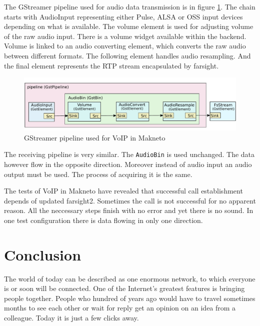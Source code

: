 The GStreamer pipeline used for audio data transmission is in figure \ref{fig:maknetoGstreamerPipeline}. The chain starts with AudioInput representing either Pulse, ALSA or OSS input devices depending on what is available. The volume element is used for adjusting volume of the raw audio input. There is a volume widget available within the backend. Volume is linked to an audio converting element, which converts the raw audio between different formats. The following element handles audio resampling. And the final element represents the RTP stream encapsulated by farsight. 

\begin{figure}[ht]
	\begin{center}
	\includegraphics[width=15cm]{fig/makneto-gstreamer-pipeline.pdf}
	\caption{GStreamer pipeline used for VoIP in Makneto}
	\label{fig:maknetoGstreamerPipeline}
\end{center}
\end{figure}

The receiving pipeline is very similar. The \verb|AudioBin| is used unchanged. The data however flow in the opposite direction. Moreover instead of audio input an audio output must be used. The process of acquiring it is the same.

The tests of VoIP in Makneto have revealed that successful call establishment depends of updated farsight2. Sometimes the call is not successful for no apparent reason. All the neccessary steps finish with no error and yet there is no sound. In one test configuration there is data flowing in only one direction. 


\chapter{Conclusion}
The world of today can be described as one enormous network, to which everyone is or soon will be connected. One of the Internet's greatest features is bringing people together. People who hundred of years ago would have to travel sometimes months to see each other or wait for reply get an opinion on an idea from a colleague. Today it is just a few clicks away.

